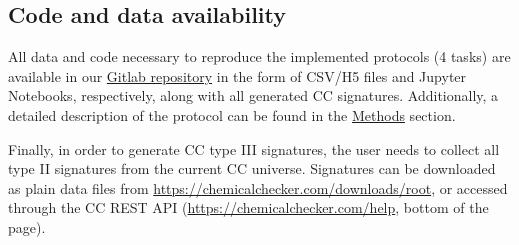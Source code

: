 \subsection{Code and data availability}
\label{Protocols_Code}

All data and code necessary to reproduce the implemented protocols (4 tasks) are available in our \href{https://gitlabsbnb.irbbarcelona.org/packages/protocols}{Gitlab repository} in the form of CSV/H5 files and Jupyter Notebooks, respectively, along with all generated CC signatures. Additionally, a detailed description of the protocol can be found in the \hyperref[Protocols_Methods]{Methods} section. 


Finally, in order to generate CC type III signatures, the user needs to collect all type II signatures from the current CC universe. Signatures can be downloaded as plain data files from \href{https://chemicalchecker.com/downloads/root}{https://chemicalchecker.com/downloads/root}, or accessed through the CC REST API (\href{https://chemicalchecker.com/help}{https://chemicalchecker.com/help}, bottom of the page).



